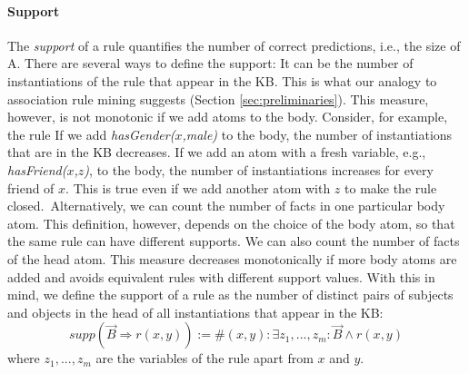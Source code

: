 \paragraph{Support} The \emph{support} of a rule quantifies the number of correct predictions, i.e., the size of A. There are several ways to define the support: It can be the number of instantiations of the rule that appear in the KB. This is what our analogy to association rule mining \cite{AgrImiSwa93} suggests (Section \ref{sec:preliminaries}). This measure, however, is not monotonic if we add atoms to the body. Consider, for example, the rule
If we add \emph{hasGender($x$,male)} to the body, the number of instantiations that are in the KB decreases. If we add an atom with a fresh variable, e.g., \emph{hasFriend($x$,$z$)}, to the body, the number of instantiations increases for every friend of $x$. This is true even if we add another atom with $z$ to make the rule closed.\
Alternatively, we can count the number of facts in one particular body atom.
This definition, however, depends on the choice of the body atom, so that the same rule can have different supports. We can also count the number of facts of the head atom.
This measure decreases monotonically if more body atoms are added 
and avoids equivalent rules with different support values. With this in mind, we define the support of a rule as the number of distinct pairs of subjects and objects in the head of all instantiations that appear in the KB:
\[supp(\vec{B} \Rightarrow r(x,y)) := \#(x,y): \exists z_1,...,z_m: \vec{B} \wedge r(x,y)\]
where $z_1,...,z_m$ are the variables of the rule apart from $x$ and $y$.

